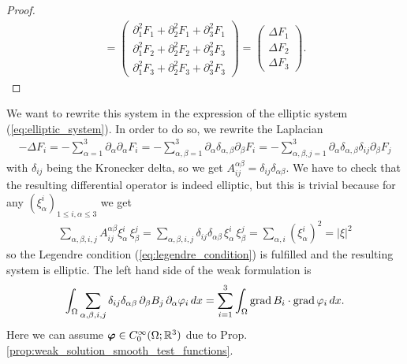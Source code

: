 \documentclass[../master_thesis.tex]{subfiles}
\begin{document}
\begin{proof}
\begin{align*}
        = \begin{pmatrix}
            \partial_1^2 F_1 + \partial_2^2 F_1 + \partial_3^2 F_1
            \\ \partial_1^2 F_2 + \partial_2^2 F_2 + \partial_3^2 F_3
            \\ \partial_1^2 F_3 + \partial_2^2 F_3 + \partial_3^2 F_3
        \end{pmatrix}
        = \begin{pmatrix}
            \Delta F_1 \\ \Delta F_2 \\ \Delta F_3
        \end{pmatrix}.
    \end{align*}
\end{proof}
We want to rewrite this system in the expression of the elliptic system 
(\ref{eq:elliptic_system}). In order to do so, we rewrite the Laplacian
\begin{align*}
    - \Delta F_i = - \sum\limits_{\alpha = 1}^3 
        \partial_\alpha \partial_\alpha F_i
    = - \sum\limits_{\alpha,\beta = 1}^3 
    \partial_\alpha \delta_{\alpha,\beta} \partial_\beta F_i
    = - \sum\limits_{\alpha,\beta,j = 1}^3 
    \partial_\alpha \delta_{\alpha,\beta} \delta_{ij} \partial_\beta F_j
\end{align*}
with $\delta_{ij}$ being the Kronecker delta, 
so we get $A_{ij}^{\alpha\beta} = \delta_{ij} \delta_{\alpha \beta}$.
We have to check that the resulting differential operator is indeed
elliptic, but this is trivial because for any 
$(\xi_\alpha^i)_{1\leq i,\alpha \leq 3}$
we get 
\begin{align*}
    \sum\limits_{\alpha,\beta,i,j} A_{ij}^{\alpha\beta} \xi_\alpha^i \, \xi_\beta^j 
    = \sum\limits_{\alpha,\beta,i,j} \delta_{ij} \delta_{\alpha \beta} 
        \,\xi_\alpha^i \,\xi_\beta^j 
    = \sum\limits_{\alpha,i} (\xi_\alpha^i)^2 = |\xi|^2
\end{align*}
so  the Legendre condition (\ref{eq:legendre_condition}) 
is fulfilled and the resulting system is elliptic. The left hand side of the weak formulation 
is 
\begin{align*}
    \int_\Omega \sum\limits_{\alpha,\beta,i,j} \delta_{ij} \delta_{\alpha\beta}
        \,\partial_\beta B_j \, \partial_\alpha \varphi_i \,dx 
    = \sum\limits_{i=1}^3 \int_\Omega \operatorname{grad} B_i \cdot \operatorname{grad} \varphi_i \,dx.
\end{align*}
Here we can assume $\bm{\varphi} \in C_0^\infty (\Omega;\mathbb{R}^3)$
due to Prop.\,\ref{prop:weak_solution_smooth_test_functions}.
\end{document}

